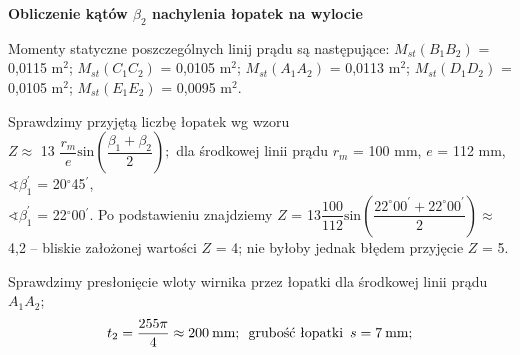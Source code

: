 \documentclass[a4paper]{book}
\begin{document}
\begin{table}[h!]
\begin{center}
	\end{center}
\end{table}
\vspace*{-\baselineskip}
\par\textbf{Obliczenie kątów $\beta_2$ nachylenia łopatek na wylocie} \\
\vspace*{-\baselineskip}
\par Momenty statyczne poszczególnych linij prądu są następujące: $M_{st}(B_1B_2)$ = 0,0115 $\text{m}^2$; $M_{st}(C_1C_2)$ = 0,0105 $\text{m}^2$; $M_{st}(A_1A_2)$ = 0,0113 $\text{m}^2$; $M_{st}(D_1D_2)$ = 0,0105 $\text{m}^2$; $M_{st}(E_1E_2)$ = 0,0095 $\text{m}^2$.
\par Sprawdzimy przyjętą liczbę łopatek wg wzoru \\
$Z \approx$ 13 $\dfrac{r_m}{e}\text{sin}\left(\dfrac{\beta_1 + \beta_2}{2}\right);$ dla środkowej linii prądu $r_m$ = 100 mm, $e$ = 112 mm, $\sphericalangle \beta_1^\prime$ = 20$^{\circ}$45$^\prime$,\\
$\sphericalangle \beta_1^\prime$ = 22$^{\circ}$00$^\prime$. Po podstawieniu znajdziemy $Z$ = 13$\dfrac{100}{112}\text{sin}\left(\dfrac{22^{\circ}00^\prime + 22^{\circ}00^\prime}{2}\right) \approx$ 4,2 -- bliskie założonej wartości $Z$ = 4; nie byłoby jednak błędem przyjęcie $Z$ = 5. \\
\vspace*{-\baselineskip}
\par	Sprawdzimy presłonięcie wloty wirnika przez łopatki dla środkowej linii prądu $A_1A_2$; \\
\begin{gather*}
%
t_2 = \dfrac{255\pi}{4} \approx 200 \: \text{mm}; \enskip \text{grubość łopatki} \enskip s = 7 \: \text{mm};
%
\end{gather*}
\end{document}
